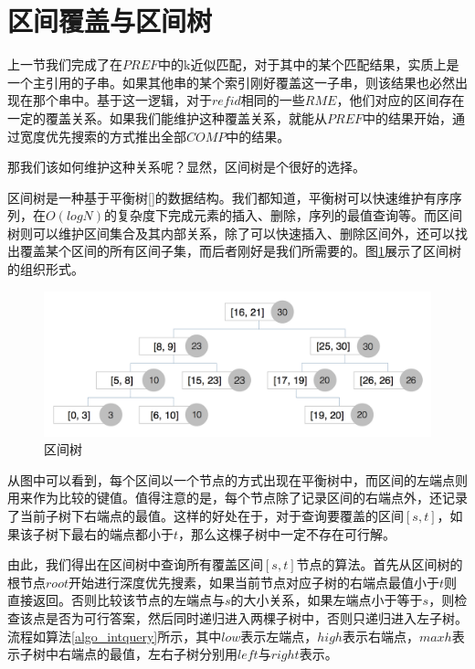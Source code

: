 ﻿\documentclass{sysuthesis}
\begin{document}
\section{区间覆盖与区间树}
上一节我们完成了在$PREF$中的k近似匹配，对于其中的某个匹配结果，实质上是一个主引用的子串。如果其他串的某个索引刚好覆盖这一子串，则该结果也必然出现在那个串中。基于这一逻辑，对于$refid$相同的一些$RME$，他们对应的区间存在一定的覆盖关系。如果我们能维护这种覆盖关系，就能从$PREF$中的结果开始，通过宽度优先搜索的方式推出全部$COMP$中的结果。\par
那我们该如何维护这种关系呢？显然，区间树是个很好的选择。\par
区间树是一种基于平衡树[]的数据结构。我们都知道，平衡树可以快速维护有序序列，在$O(logN)$的复杂度下完成元素的插入、删除，序列的最值查询等。而区间树则可以维护区间集合及其内部关系，除了可以快速插入、删除区间外，还可以找出覆盖某个区间的所有区间子集，而后者刚好是我们所需要的。图\ref{imag_intvtree}展示了区间树的组织形式。\par

\begin{figure}[htbp]
	\centering
	\includegraphics[scale=0.25]{image/intvtree.png}
	\caption{区间树}\label{imag_intvtree}
\end{figure}

从图中可以看到，每个区间以一个节点的方式出现在平衡树中，而区间的左端点则用来作为比较的键值。值得注意的是，每个节点除了记录区间的右端点外，还记录了当前子树下右端点的最值。这样的好处在于，对于查询要覆盖的区间$[s, t]$，如果该子树下最右的端点都小于$t$，那么这棵子树中一定不存在可行解。\par
由此，我们得出在区间树中查询所有覆盖区间$[s, t]$节点的算法。首先从区间树的根节点$root$开始进行深度优先搜素，如果当前节点对应子树的右端点最值小于$t$则直接返回。否则比较该节点的左端点与$s$的大小关系，如果左端点小于等于$s$，则检查该点是否为可行答案，然后同时递归进入两棵子树中，否则只递归进入左子树。流程如算法\ref{algo_intquery}所示，其中$low$表示左端点，$high$表示右端点，$maxh$表示子树中右端点的最值，左右子树分别用$left$与$right$表示。\par
\end{document}
